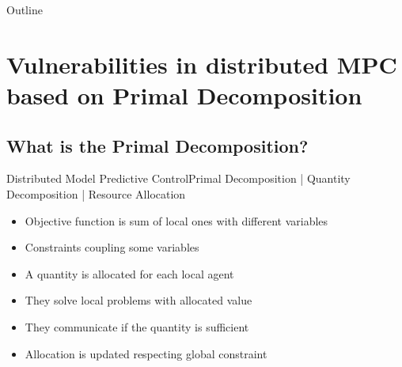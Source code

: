 \documentclass[aspectratio=169]{beamer}
\begin{document}
\begin{frame}{Outline}
  \tableofcontents[subsectionstyle=hide/hide/hide,pausesections]
\end{frame}

\section[Vulnerabilities in dMPC based on Primal decomposition]{Vulnerabilities in distributed MPC based on Primal Decomposition}

\subsection{What is the Primal Decomposition?}

\begin{frame}{Distributed Model Predictive Control}{Primal Decomposition | Quantity Decomposition | Resource Allocation}
  \begin{itemize}
    \item<2-> Objective function is sum of local ones with different variables
    \item<3-> Constraints coupling some variables
  \end{itemize}
  \vspace{.5cm}

  \begin{itemize}
    \item<5-> A quantity is allocated for each local agent
    \item<6-> They solve local problems with allocated value
    \item<7-> They communicate if the quantity is sufficient
    \item<8-> Allocation is updated respecting global constraint
  \end{itemize}
\end{frame}
\end{document}
